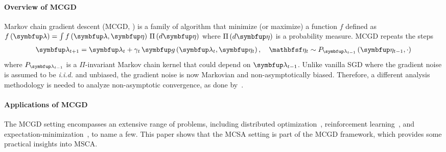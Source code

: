 \paragraph{\textbf{Overview of MCGD}}
Markov chain gradient descent (MCGD, \citealt{duchi_ergodic_2012, NEURIPS2018_1371bcce}) is a family of algorithm that minimize (or maximize) a function \(f\) defined as \(f\left(\vlambda\right) = \int f\left(\vlambda, \veta\right) \, \Pi\left(d\veta\right)\) where \(\Pi\left(d\veta\right)\) is a probability measure.
MCGD repeats the steps 
{%
\begin{align}
  \vlambda_{t+1}    = \vlambda_{t} + \gamma_t \, \vg\left(\vlambda_t, \veta_{t}\right),\quad 
  \rvveta_{t}  \sim P_{\vlambda_{t-1}}\left( \veta_{t-1}, \cdot \right)\label{eq:mcgd}
\end{align}
}%
where \(P_{\vlambda_{t-1}}\) is a \(\Pi\)-invariant Markov chain kernel that could depend on \(\vlambda_{t-1}\).
Unlike vanilla SGD where the gradient noise is assumed to be \textit{i.i.d.} and unbiased, the gradient noise is now Markovian and non-asymptotically biased.
Therefore, a different analysis methodology is needed to analyze non-asymptotic convergence, as done by~\citep{duchi_ergodic_2012, NEURIPS2018_1371bcce, pmlr-v99-karimi19a, doan_finitetime_2020, doan_convergence_2020, Xiong_Xu_Liang_Zhang_2021, debavelaere_convergence_2021}.

\vspace{-0.1in}
\paragraph{\textbf{Applications of MCGD}}
The MCGD setting encompasses an extensive range of problems, including distributed optimization~\citep{ram_incremental_2009}, reinforcement learning~\citep{tadic_asymptotic_2017, doan_convergence_2020, Xiong_Xu_Liang_Zhang_2021}, and expectation-minimization~\citep{pmlr-v99-karimi19a}, to name a few.
This paper shows that the MCSA setting is part of the MCGD framework, which provides some practical insights into MSCA.

